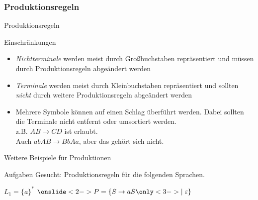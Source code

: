 \subsubsection{Produktionsregeln}
\begin{frame}{Produktionsregeln}
    \begin{alertblock}{Einschränkungen}
    \begin{itemize}
        \item \alert{\emph{Nichtterminale}} werden meist durch Großbuchstaben repräsentiert und müssen durch Produktionsregeln abgeändert werden
        \item \alert{\emph{Terminale}} werden meist durch Kleinbuchstaben repräsentiert und sollten \emph{nicht} durch weitere Produktionsregeln abgeändert werden
        \item Mehrere Symbole können auf einen Schlag überführt werden. Dabei sollten die Terminale nicht entfernt oder umsortiert werden.\\
        z.B. $AB \rightarrow CD$ ist erlaubt.\\
        Auch $abAB \rightarrow BbAa$, aber das gehört sich nicht.
    \end{itemize}
    \end{alertblock}
\end{frame}

\begin{frame}{Weitere Beispiele für Produktionen}
    \begin{alertblock}{Aufgaben}
    Gesucht: Produktionsregeln für die folgenden Sprachen.
    \end{alertblock}
    \begin{exampleblock}{$L_1 = \{a\}^*$}
    $\onslide<2->{P=\{S \rightarrow aS \only<3->{\mid \emptyWord\}}}$
    \end{exampleblock}
\end{frame}

